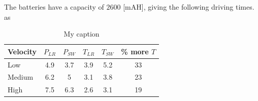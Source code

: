 The batteries have a capacity of $2600$ [mAH], giving the following driving times. as

\begin{table}[h]
	\centering
	\caption{My caption}
	\label{my-label}
	\begin{tabular}{|l|c|c|c|c|c|}
		\hline
		\textbf{Velocity} & $P_{LR}$ & $P_{SW}$ & $T_{LR}$& $T_{SW}$ & \% \textbf{more} $T$ \\ \hline
		Low       & 4.9                         & 3.7                               & 3.9              & 5.2                      & 33                 \\ \hline
		Medium  & 6.2                         & 5                                 & 3.1              & 3.8                      & 23                 \\ \hline
		High      & 7.5                         & 6.3                               & 2.6              & 3.1                      & 19                 \\ \hline
	\end{tabular}
\end{table}

